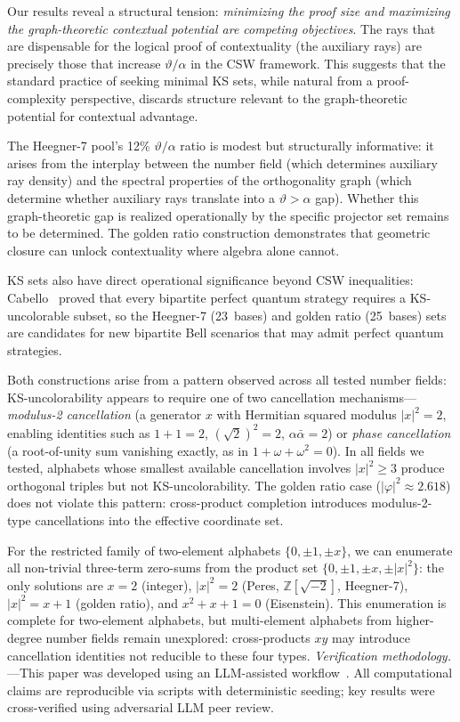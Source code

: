 \documentclass[twocolumn,prl,superscriptaddress,nofootinbib]{revtex4-2}
\newcommand{\Z}{\mathbb{Z}}
\begin{document}
Our results reveal a structural tension: \emph{minimizing the proof size and maximizing the graph-theoretic contextual potential are competing objectives}. The rays that are dispensable for the logical proof of contextuality (the auxiliary rays) are precisely those that increase $\vartheta/\alpha$ in the CSW framework. This suggests that the standard practice of seeking minimal KS sets, while natural from a proof-complexity perspective, discards structure relevant to the graph-theoretic potential for contextual advantage.

The Heegner-7 pool's 12\% $\vartheta/\alpha$ ratio is modest but structurally informative: it arises from the interplay between the number field (which determines auxiliary ray density) and the spectral properties of the orthogonality graph (which determine whether auxiliary rays translate into a $\vartheta > \alpha$ gap). Whether this graph-theoretic gap is realized operationally by the specific projector set remains to be determined. The golden ratio construction demonstrates that geometric closure can unlock contextuality where algebra alone cannot.

KS sets also have direct operational significance beyond CSW inequalities: Cabello~\cite{Cabello2024bipartite} proved that every bipartite perfect quantum strategy requires a KS-uncolorable subset, so the Heegner-7 (23~bases) and golden ratio (25~bases) sets are candidates for new bipartite Bell scenarios that may admit perfect quantum strategies.

Both constructions arise from a pattern observed across all tested number fields: KS-uncolorability appears to require one of two cancellation mechanisms---\emph{modulus-2 cancellation} (a generator $x$ with Hermitian squared modulus $|x|^2 = 2$, enabling identities such as $1{+}1=2$, $(\sqrt{2})^2=2$, $\alpha\bar\alpha=2$) or \emph{phase cancellation} (a root-of-unity sum vanishing exactly, as in $1{+}\omega{+}\omega^2 = 0$).  In all fields we tested, alphabets whose smallest available cancellation involves $|x|^2 \geq 3$ produce orthogonal triples but not KS-uncolorability.  The golden ratio case ($|\varphi|^2 \approx 2.618$) does not violate this pattern: cross-product completion introduces modulus-2-type cancellations into the effective coordinate set.

For the restricted family of two-element alphabets $\{0, \pm 1, \pm x\}$, we can enumerate all non-trivial three-term zero-sums from the product set $\{0, \pm 1, \pm x, \pm |x|^2\}$: the only solutions are $x = 2$ (integer), $|x|^2 = 2$ (Peres, $\Z[\sqrt{-2}]$, Heegner-7), $|x|^2 = x + 1$ (golden ratio), and $x^2 + x + 1 = 0$ (Eisenstein).  This enumeration is complete for two-element alphabets, but multi-element alphabets from higher-degree number fields remain unexplored: cross-products $xy$ may introduce cancellation identities not reducible to these four types.
\textit{Verification methodology.}---This paper was developed using an LLM-assisted workflow~\cite{Schwartz2026}.  All computational claims are reproducible via scripts with deterministic seeding; key results were cross-verified using adversarial LLM peer review.
\end{document}
